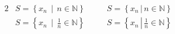 \documentclass{article}
\newcommand{\Oldsuchthat}{\, \mid \,}
\newcommand*{\suchthat}[1]{\,\left|\, #1 \right.}
\begin{document}
\begin{alignat}{2}
&S = \left\{ x_n \Oldsuchthat n \in \mathbb{N} \right\} &\quad
%
&S = \left\{ x_n \suchthat{n \in \mathbb{N}}  \right\} \\[2.0ex]
&S = \left\{ x_n \Oldsuchthat \frac{1}{n} \in \mathbb{N} \right\} &\quad
&S = \left\{ x_n \suchthat{\frac{1}{n} \in \mathbb{N}} \right\}
\end{alignat}
\end{document}
